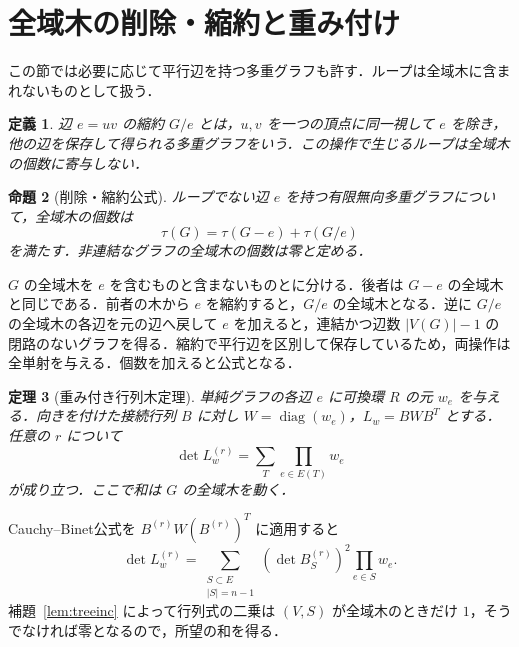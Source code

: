 \documentclass[a5paper,10pt,onecolumn]{jsarticle}
\makeatletter
\theoremstyle{mathnotetheorem}
\newtheorem{theorem}{定理}[section]
\newtheorem{definition}[theorem]{定義}
\newtheorem{proposition}[theorem]{命題}
\renewcommand{\proofname}{証明}
\renewenvironment{proof}[1][\proofname]{%
  \par\pushQED{\qed}\normalfont\topsep4\p@\@plus2\p@\relax
  \trivlist\item[\hskip\labelsep\bfseries #1]\ignorespaces
}{\popQED\endtrivlist\@endpefalse}
\makeatother
\begin{document}
\section{全域木の削除・縮約と重み付け}
この節では必要に応じて平行辺を持つ多重グラフも許す．ループは全域木に含まれないものとして扱う．
\begin{definition}
辺 $e=uv$ の\emph{縮約} $G/e$ とは，$u,v$ を一つの頂点に同一視して $e$ を除き，他の辺を保存して得られる多重グラフをいう．この操作で生じるループは全域木の個数に寄与しない．
\end{definition}
\begin{proposition}[削除・縮約公式]\label{prop:deletion}
ループでない辺 $e$ を持つ有限無向多重グラフについて，全域木の個数は
\[
 \tau(G)=\tau(G-e)+\tau(G/e)
\]
を満たす．非連結なグラフの全域木の個数は零と定める．
\end{proposition}
\begin{proof}
$G$ の全域木を $e$ を含むものと含まないものとに分ける．後者は $G-e$ の全域木と同じである．前者の木から $e$ を縮約すると，$G/e$ の全域木となる．逆に $G/e$ の全域木の各辺を元の辺へ戻して $e$ を加えると，連結かつ辺数 $|V(G)|-1$ の閉路のないグラフを得る．縮約で平行辺を区別して保存しているため，両操作は全単射を与える．個数を加えると公式となる．
\end{proof}
\begin{theorem}[重み付き行列木定理]\label{thm:weighted-tree}
単純グラフの各辺 $e$ に可換環 $R$ の元 $w_e$ を与える．向きを付けた接続行列 $B$ に対し $W=\operatorname{diag}(w_e)$，$L_w=BWB^T$ とする．任意の $r$ について
\[
 \det L_w^{(r)}=\sum_{T}\prod_{e\in E(T)}w_e
\]
が成り立つ．ここで和は $G$ の全域木を動く．
\end{theorem}
\begin{proof}
Cauchy--Binet公式を $B^{(r)}W(B^{(r)})^T$ に適用すると
\[
 \det L_w^{(r)}
 =\sum_{\substack{S\subset E\\|S|=n-1}}
 (\det B_S^{(r)})^2\prod_{e\in S}w_e.
\]
補題~\ref{lem:treeinc} によって行列式の二乗は $(V,S)$ が全域木のときだけ $1$，そうでなければ零となるので，所望の和を得る．
\end{proof}
\end{document}

